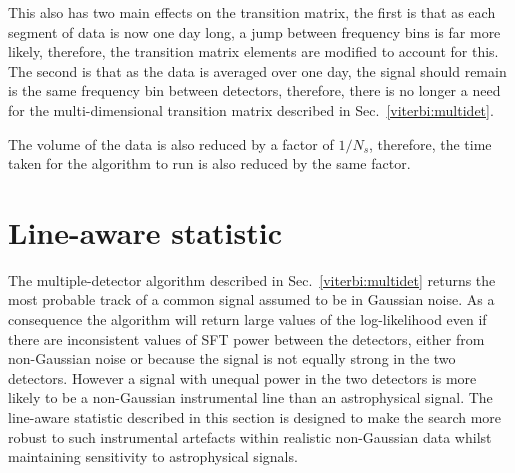 This also has two main effects on the transition matrix, the first is that as each segment of data is now one day long, a jump between frequency bins is far more likely, therefore, the transition matrix elements are modified to account for this. The second is that as the data is averaged over one day, the signal should remain is the same frequency bin between detectors, therefore, there is no longer a need for the multi-dimensional transition matrix described in Sec.~\ref{viterbi:multidet}.

The volume of the data is also reduced by a factor of $1/N_s$, therefore, the time taken for the algorithm to run is also reduced by the same factor.

\section{\label{viterbi:las}Line-aware statistic}
%
%
The multiple-detector algorithm described in Sec.~\ref{viterbi:multidet} returns the most probable track of a common signal assumed to be in Gaussian noise. As a consequence the algorithm will return large values of the log-likelihood even if there are inconsistent values of \ac{SFT} power between the detectors, either from non-Gaussian noise or because the signal is not equally strong in the two detectors. However a signal with unequal power in the two detectors is more likely to be a non-Gaussian instrumental line than an astrophysical signal. The line-aware statistic described in this section is designed to make the search more robust to such instrumental artefacts within realistic non-Gaussian data whilst maintaining sensitivity to astrophysical signals.

